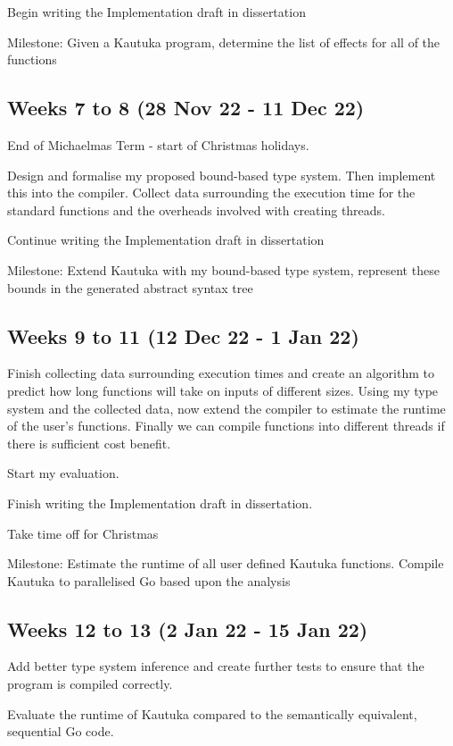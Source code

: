 \documentclass[12pt,a4paper,twoside,openright]{report}
\begin{document}
Begin writing the Implementation draft in dissertation 

Milestone: Given a Kautuka program, determine the list of effects for all of the functions 

\subsection*{Weeks 7 to 8 (28 Nov 22 - 11 Dec 22)}
End of Michaelmas Term - start of Christmas holidays.

Design and formalise my proposed bound-based type system. Then implement this into the compiler. Collect data surrounding the execution time for the standard functions and the overheads involved with creating threads.

Continue writing the Implementation draft in dissertation

Milestone: Extend Kautuka with my bound-based type system, represent these bounds in the generated abstract syntax tree 

\subsection*{Weeks 9 to 11 (12 Dec 22 - 1 Jan 22)}

Finish collecting data surrounding execution times and create an algorithm to predict how long functions will take on inputs of different sizes. Using my type system and the collected data, now extend the compiler to estimate the runtime of the user's functions. Finally we can compile functions into different threads if there is sufficient cost benefit.

Start my evaluation.

Finish writing the Implementation draft in dissertation.

Take time off for Christmas

Milestone: Estimate the runtime of all user defined Kautuka functions. Compile Kautuka to parallelised Go based upon the analysis 

\subsection*{Weeks 12 to 13 (2 Jan 22 - 15 Jan 22)}

Add better type system inference and create further tests to ensure that the program is compiled correctly. 

Evaluate the runtime of Kautuka compared to the semantically equivalent, sequential Go code.
\end{document}
